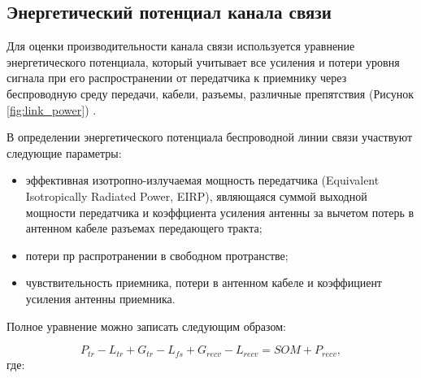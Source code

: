 \subsection{Энергетический потенциал канала связи}
Для оценки производительности канала связи используется уравнение энергетического потенциала, который учитывает все усиления и потери уровня сигнала при его распространении от передатчика к приемнику через беспроводную  среду передачи, кабели, разъемы, различные препятствия (Рисунок \cref{fig:link_power}) \cite{Proletarsky}.

В определении энергетического потенциала беспроводной линии связи участвуют следующие параметры:
\begin{itemize}
  \item эффективная изотропно-излучаемая мощность передатчика (Equivalent Isotropically Radiated Power, EIRP), являющаяся суммой выходной мощности передатчика и коэффциента усиления антенны за вычетом потерь в антенном кабеле разъемах передающего тракта;
  \item потери пр распротранении в свободном протранстве;
  \item чувствительность приемника, потери в антенном кабеле и коэффициент усиления антенны приемника.
\end{itemize}
Полное уравнение можно записать следующим образом:



\begin{equation}
  \label{eq:part3_link_budget}
  P_{tr} - L_{tr} + G_{tr} - L_{fs} + G_{recv} - L_{recv} = SOM + P_{recv},
\end{equation}
где:

